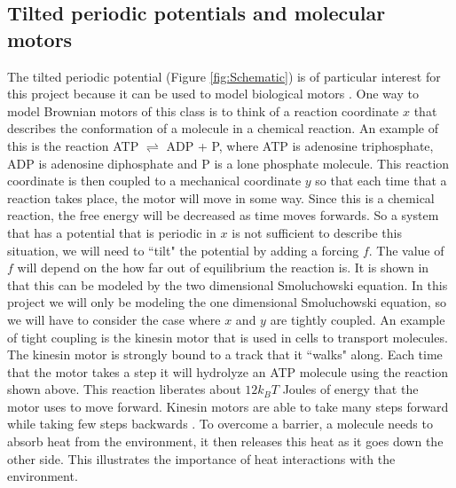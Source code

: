 \subsection{Tilted periodic potentials and molecular motors}
The tilted periodic potential (Figure \ref{fig:Schematic}) is of particular interest for this project because it can be used to model biological motors \cite{Leibler1993,Magnasco1994}. One way to model Brownian motors of this class is to think of a reaction coordinate $x$ that describes the conformation of a molecule in a chemical reaction. An example of this is the reaction ATP $\rightleftharpoons$ ADP + P, where ATP is adenosine triphosphate, ADP is adenosine diphosphate and P is a lone phosphate molecule. This reaction coordinate is then coupled to a mechanical coordinate $y$ so that each time that a reaction takes place, the motor will move in some way. Since this is a chemical reaction, the free energy will be decreased as time moves forwards. So a system that has a potential that is periodic in $x$ is not sufficient to describe this situation, we will need to ``tilt" the potential by adding a forcing $f$. The value of $f$ will depend on the how far out of equilibrium the reaction is. It is shown in \cite{Magnasco1994} that this can be modeled by the two dimensional Smoluchowski equation. In this project we will only be modeling the one dimensional Smoluchowski equation, so we will have to consider the case where $x$ and $y$ are tightly coupled. An example of tight coupling is the kinesin motor \cite{Leibler1993} that is used in cells to transport molecules. The kinesin motor is strongly bound to a track that it ``walks" along. Each time that the motor takes a step it will hydrolyze an ATP molecule using the reaction shown above. This reaction liberates about $12 k_B T$ Joules of energy that the motor uses to move forward. Kinesin motors are able to take many steps forward while taking few steps backwards \cite{BlockSM1990}. To overcome a barrier, a molecule needs to absorb heat from the environment, it then releases this heat as it goes down the other side. This illustrates the importance of heat interactions with the environment.

